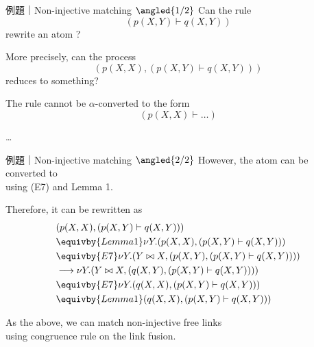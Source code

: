 \begin{frame}{例題｜Non-injective matching $\angled{1/2}$}
  Can the rule 
  \[
  (p(X, Y) \vdash q(X, Y))
  \]
  rewrite an atom  ?

  More precisely, can the process 
  \[
  (p(X, X), (p(X, Y) \vdash q(X, Y)))
  \]
  reduces to something?

  The rule cannot be $\alpha$-converted to the form
  \[ (p(X, X) \vdash \dots) \]

  \dots
\end{frame}
  
\begin{frame}{例題｜Non-injective matching $\angled{2/2}$}
  However, the atom  can be converted to\\
   using (E7) and Lemma 1.

  Therefore, it can be rewritten as
  \begin{align*}
    & (p(X, X), (p(X, Y) \vdash q(X, Y))) \\
    & \equivby{Lemma 1}
    \nu Y.(p(X, X), (p(X, Y) \vdash q(X, Y)))\\
    & \equivby{E7}
    \nu Y.(Y \bowtie X, (p(X, Y), (p(X, Y) \vdash q(X, Y))))\\
    & \longrightarrow
    \nu Y.(Y \bowtie X, (q(X, Y), (p(X, Y) \vdash q(X, Y))))\\
    & \equivby{E7}
    \nu Y.(q(X, X), (p(X, Y) \vdash q(X, Y)))\\
    & \equivby{Lemma 1}
    (q(X, X), (p(X, Y) \vdash q(X, Y)))
  \end{align*}

  As the above, we can match non-injective free links\\
  using congruence rule on the link fusion. 
\end{frame}


